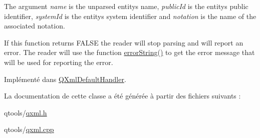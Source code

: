 The argument {\itshape name} is the unparsed entity\textquotesingle{}s name, {\itshape public\+Id} is the entity\textquotesingle{}s public identifier, {\itshape system\+Id} is the entity\textquotesingle{}s system identifier and {\itshape notation} is the name of the associated notation.

If this function returns F\+A\+L\+S\+E the reader will stop parsing and will report an error. The reader will use the function \hyperlink{class_q_xml_d_t_d_handler_a40f40b9674be96a009a93147d5e0178d}{error\+String()} to get the error message that will be used for reporting the error. 

Implémenté dans \hyperlink{class_q_xml_default_handler_ae4fe530e822e9d5d92a1c849c3f96488}{Q\+Xml\+Default\+Handler}.



La documentation de cette classe a été générée à partir des fichiers suivants \+:\begin{DoxyCompactItemize}
\item 
qtools/\hyperlink{qxml_8h}{qxml.\+h}\item 
qtools/\hyperlink{qxml_8cpp}{qxml.\+cpp}\end{DoxyCompactItemize}
